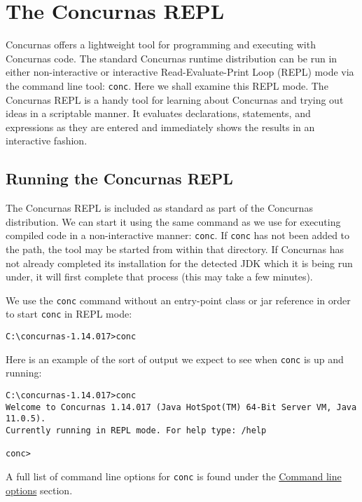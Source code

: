 \documentclass[conc-doc]{subfiles}
\begin{document}
	\chapter[The Concurnas REPL]{The Concurnas REPL}
	\label{ch:repl}

Concurnas offers a lightweight tool for programming and executing with Concurnas code. The standard Concurnas runtime distribution can be run in either non-interactive or interactive Read-Evaluate-Print Loop (REPL) mode via the command line tool: \lstinline[language=None]{conc}. Here we shall examine this REPL mode. The Concurnas REPL is a handy tool for learning about Concurnas and trying out ideas in a scriptable manner. It evaluates declarations, statements, and expressions as they are entered and immediately shows the results in an interactive fashion.	

\section{Running the Concurnas REPL}
The Concurnas REPL is included as standard as part of the Concurnas distribution. We can start it using the same command as we use for executing compiled code in a non-interactive manner: \lstinline[language=None]{conc}. If \lstinline[language=None]{conc} has not been added to the path, the tool may be started from within that directory. If Concurnas has not already completed its installation for the detected JDK which it is being run under, it will first complete that process (this may take a few minutes).

We use the \lstinline[language=None]{conc} command without an entry-point class or jar reference in order to start \lstinline[language=None]{conc} in REPL mode:

\begin{lstlisting}[language=None]
C:\concurnas-1.14.017>conc
\end{lstlisting}

Here is an example of the sort of output we expect to see when \lstinline[language=None]{conc} is up and running:

\begin{lstlisting}[language=None]
C:\concurnas-1.14.017>conc
Welcome to Concurnas 1.14.017 (Java HotSpot(TM) 64-Bit Server VM, Java 11.0.5).
Currently running in REPL mode. For help type: /help

conc> 
\end{lstlisting}

A full list of command line options for \lstinline[language=None]{conc} is found under the \hyperref[sec:cmdlineparams]{Command line options} section.
\end{document}
